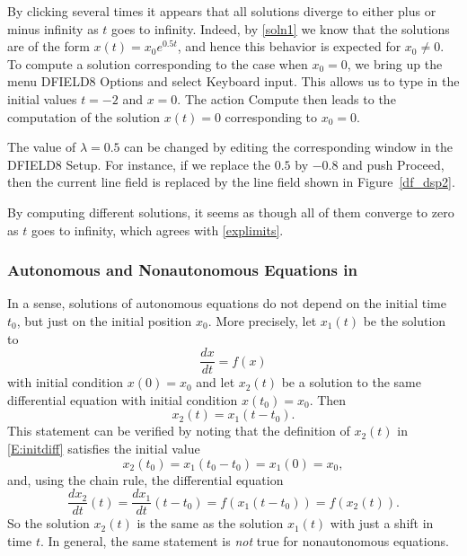 \documentclass{ximera}
\begin{document}
By clicking several times it appears that all solutions diverge
to either plus or minus infinity as $t$ goes to infinity.
Indeed, by \eqref{soln1} we know that the solutions are of the
form $x(t) = x_0 e^{0.5 t}$, and hence this behavior is expected
for $x_0\not= 0$.  To compute a solution corresponding to the case
when $x_0=0$, we bring up the menu {\sf DFIELD8 Options} and select
{\sf Keyboard input}.  This allows us to type in the initial
values $t=-2$ and $x=0$.  The action {\sf Compute} then leads to
the computation of the solution $x(t)=0$ corresponding to $x_0=0$.

The value of $\lambda=0.5$ can be changed by editing the
corresponding window in the {\sf DFIELD8 Setup.} For instance, if
we replace the $0.5$ by $-0.8$ and push {\sf Proceed}, then the
current line field is replaced by the line field shown
in Figure~\ref{df_dsp2}.
\begin{figure*}[htb]
    \centerline{%
    }
    \caption{Left: Line field for $\dot{x}=-0.8 x$ for $t\in [-4,10]$
	and $x\in [-4,4]$.  Right: A solution starting at $t=0$ and
	$x$ between $1$ and $2$.}
    \label{df_dsp2}
\end{figure*}

By computing different solutions, it seems as though all of them
converge to zero as $t$ goes to infinity, which agrees with
\eqref{explimits}.


\subsubsection*{Autonomous and Nonautonomous Equations in {\dfield}}

In a sense, solutions of autonomous equations do not depend on the initial
time $t_0$, but just on the initial position $x_0$.  More precisely, let
$x_1(t)$ be the solution to
\[
\frac{dx}{dt} = f(x)
\]
with initial condition $x(0)=x_0$ and let $x_2(t)$ be a solution
to the same differential equation with initial condition $x(t_0)=x_0$.
Then
\begin{equation}  \label{E:initdiff}
x_2(t) = x_1(t-t_0).
\end{equation}
This statement can be verified by noting that the definition of
$x_2(t)$ in \eqref{E:initdiff} satisfies the initial value
\[
x_2(t_0)=x_1(t_0-t_0)=x_1(0)=x_0,
\]
and, using the chain rule, the differential equation
\[
\frac{dx_2}{dt}(t) = \frac{dx_1}{dt}(t-t_0) = f(x_1(t-t_0))=f(x_2(t)).
\]
So the solution $x_2(t)$ is the same as the solution $x_1(t)$ with
just a shift in time $t$.  In general, the same statement is {\em not\/} 
true for nonautonomous equations.
\end{document}
